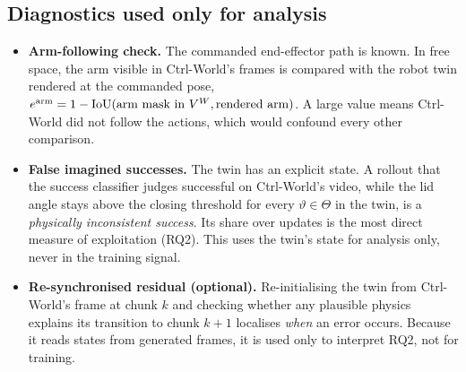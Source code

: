 \subsection{Diagnostics used only for analysis}\label{method:sec:diag}
\begin{itemize}
\item \textbf{Arm-following check.} The commanded end-effector path is known. In free space, the arm visible in Ctrl-World's frames is compared with the robot twin rendered at the commanded pose, $e^{\mathrm{arm}}=1-\operatorname{IoU}(\text{arm mask in }V^{W},\text{rendered arm})$. A large value means Ctrl-World did not follow the actions, which would confound every other comparison.
\item \textbf{False imagined successes.} The twin has an explicit state. A rollout that the success classifier judges successful on Ctrl-World's video, while the lid angle stays above the closing threshold for every $\vartheta\in\Theta$ in the twin, is a \emph{physically inconsistent success}. Its share over updates is the most direct measure of exploitation (RQ2). This uses the twin's state for analysis only, never in the training signal.
\item \textbf{Re-synchronised residual (optional).} Re-initialising the twin from Ctrl-World's frame at chunk $k$ and checking whether any plausible physics explains its transition to chunk $k+1$ localises \emph{when} an error occurs. Because it reads states from generated frames, it is used only to interpret RQ2, not for training.
\end{itemize}

\renewcommand{\thesubsection}{\thesection.\arabic{subsection}}
\renewcommand{\thesubsubsection}{\thesubsection.\arabic{subsubsection}}
